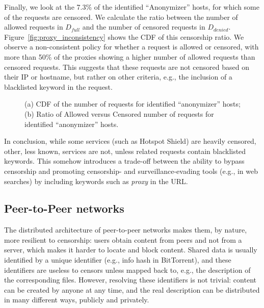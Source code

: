 \documentclass{sig-alternate-2013}
\def\df{$D_{full}$\xspace}
\def\dd{$D_{denied}$\xspace}
\begin{document}
Finally, we look at the 7.3\% of the identified ``Anonymizer'' hosts, for which some of the requests are censored. We calculate the ratio between the number of allowed requests in \df and the number of censored requests in \dd. Figure~\ref{fig:proxy_inconsistency} shows the CDF of this censorship ratio. We observe a  non-consistent policy for whether a request is allowed or censored, with more than 50\% of the proxies showing a higher number of allowed requests than censored requests. This suggests that these requests are not censored based on their IP or hostname, but rather on other criteria, e.g., the inclusion of a blacklisted keyword in the request.   





\begin{figure}[t!]
  \begin{center}
        \vspace*{-0.2cm}
        \caption{(a) CDF of the number of requests for identified ``anonymizer'' hosts; (b) Ratio of Allowed versus Censored number of requests for identified ``anonymizer'' hosts.}
	\end{center}
\vspace*{-0.2cm}
\end{figure}


In conclusion, while some services (such as Hotspot Shield) are  heavily censored, other, less known, services are not, unless related requests contain blacklisted keywords. This somehow introduces a trade-off between 
the ability to bypass censorship and promoting censorship- and surveillance-evading tools (e.g., in web searches) by including keywords such as {\em proxy} in the URL.











\subsection{Peer-to-Peer networks}

The distributed architecture of peer-to-peer networks makes them, by nature, more resilient to censorship: users obtain content from peers and not from a server, which makes it harder to locate and block content. Shared data is usually identified by a unique identifier (e.g., info hash in BitTorrent), and these identifiers are useless to censors unless mapped back to, e.g., the description of the corresponding files. However, resolving these identifiers is not trivial: content can be created by anyone at any time, and the real description can be distributed in many different ways, publicly and privately. 
\end{document}
